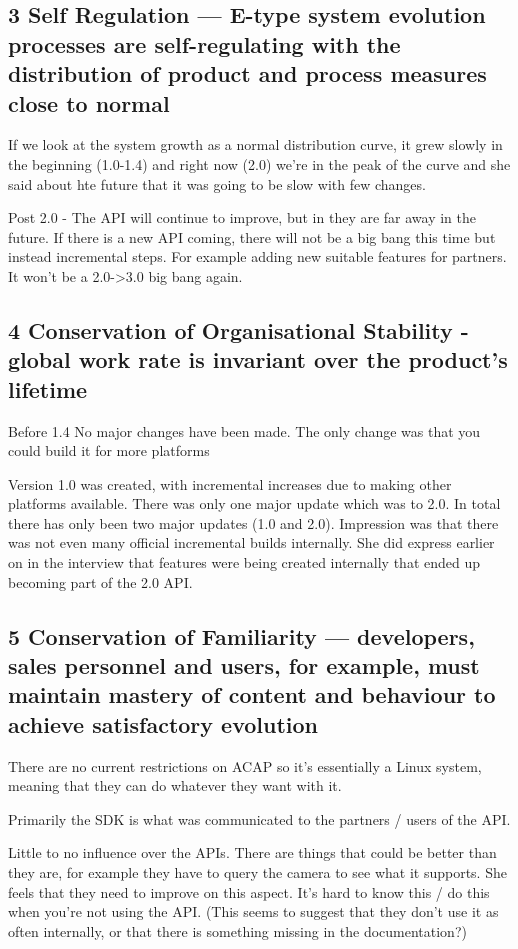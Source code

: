 \documentclass[conference]{IEEEtran}
\begin{document}
\subsection{3 Self Regulation — E-type system evolution processes are self-regulating with the distribution of product and process measures close to normal}
If we look at the system growth as a normal distribution curve, it grew slowly in the beginning (1.0-1.4) and right now (2.0) we're in the peak of the curve and she said about hte future that it was going to be slow with few changes. 

Post 2.0 - The API will continue to improve, but in they are far away in the future. If there is a new API coming, there will not be a big bang this time but instead incremental steps. For example adding new suitable features for partners. It won’t be a 2.0->3.0 big bang again. 

\subsection{4 Conservation of Organisational Stability - global work rate is invariant over the product's lifetime}
Before 1.4
No major changes have been made. 
The only change was that you could build it for more platforms

Version 1.0 was created, with incremental increases due to making other platforms available. There was only one major update which was to 2.0. In total there has only been two major updates (1.0 and 2.0).
Impression was that there was not even many official incremental builds internally. She did express earlier on in the interview that features were being created internally that ended up becoming part of the 2.0 API.


\subsection{5 Conservation of Familiarity — developers, sales personnel and users, for example, must maintain mastery of content and behaviour to achieve satisfactory evolution}
There are no current restrictions on ACAP so it’s essentially a Linux system, meaning that they can do whatever they want with it. 

Primarily the SDK is what was communicated to the partners / users of the API.

Little to no influence over the APIs. There are things that could be better than they are, for example they have to query the camera to see what it supports. She feels that they need to improve on this aspect. It’s hard to know this / do this when you’re not using the API. (This seems to suggest that they don’t use it as often internally, or that there is something missing in the documentation?)
\end{document}
